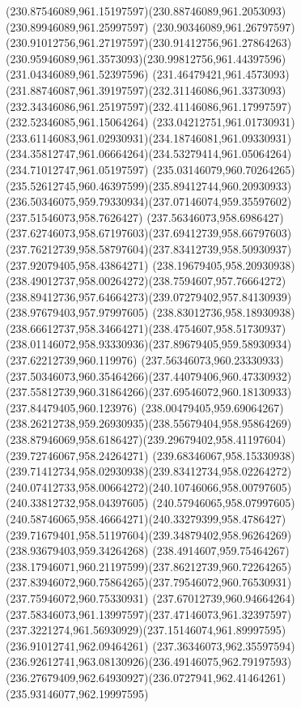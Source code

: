 {{	\curveto(230.87546089,961.15197597)(230.88746089,961.2053093)(230.89946089,961.25997597)
	\curveto(230.90346089,961.26797597)(230.91012756,961.27197597)(230.91412756,961.27864263)
	\curveto(230.95946089,961.3573093)(230.99812756,961.44397596)(231.04346089,961.52397596)
	\curveto(231.46479421,961.4573093)(231.88746087,961.39197597)(232.31146086,961.3373093)
	\curveto(232.34346086,961.25197597)(232.41146086,961.17997597)(232.52346085,961.15064264)
	\curveto(233.04212751,961.01730931)(233.61146083,961.02930931)(234.18746081,961.09330931)
	\curveto(234.35812747,961.06664264)(234.53279414,961.05064264)(234.71012747,961.05197597)
	\curveto(235.03146079,960.70264265)(235.52612745,960.46397599)(235.89412744,960.20930933)
	\curveto(236.50346075,959.79330934)(237.07146074,959.35597602)(237.51546073,958.7626427)
	\curveto(237.56346073,958.6986427)(237.62746073,958.67197603)(237.69412739,958.66797603)
	\curveto(237.76212739,958.58797604)(237.83412739,958.50930937)(237.92079405,958.43864271)
	\curveto(238.19679405,958.20930938)(238.49012737,958.00264272)(238.7594607,957.76664272)
	\curveto(238.89412736,957.64664273)(239.07279402,957.84130939)(238.97679403,957.97997605)
	\curveto(238.83012736,958.18930938)(238.66612737,958.34664271)(238.4754607,958.51730937)
	\curveto(238.01146072,958.93330936)(237.89679405,959.58930934)(237.62212739,960.119976)
	\curveto(237.56346073,960.23330933)(237.50346073,960.35464266)(237.44079406,960.47330932)
	\curveto(237.55812739,960.31864266)(237.69546072,960.18130933)(237.84479405,960.123976)
	\curveto(238.00479405,959.69064267)(238.26212738,959.26930935)(238.55679404,958.95864269)
	\curveto(238.87946069,958.6186427)(239.29679402,958.41197604)(239.72746067,958.24264271)
	\curveto(239.68346067,958.15330938)(239.71412734,958.02930938)(239.83412734,958.02264272)
	\curveto(240.07412733,958.00664272)(240.10746066,958.00797605)(240.33812732,958.04397605)
	\curveto(240.57946065,958.07997605)(240.58746065,958.46664271)(240.33279399,958.4786427)
	\curveto(239.71679401,958.51197604)(239.34879402,958.96264269)(238.93679403,959.34264268)
	\curveto(238.4914607,959.75464267)(238.17946071,960.21197599)(237.86212739,960.72264265)
	\curveto(237.83946072,960.75864265)(237.79546072,960.76530931)(237.75946072,960.75330931)
	\curveto(237.67012739,960.94664264)(237.58346073,961.13997597)(237.47146073,961.32397597)
	\curveto(237.3221274,961.56930929)(237.15146074,961.89997595)(236.91012741,962.09464261)
	\curveto(237.36346073,962.35597594)(236.92612741,963.08130926)(236.49146075,962.79197593)
	\curveto(236.27679409,962.64930927)(236.0727941,962.41464261)(235.93146077,962.19997595)
}}

